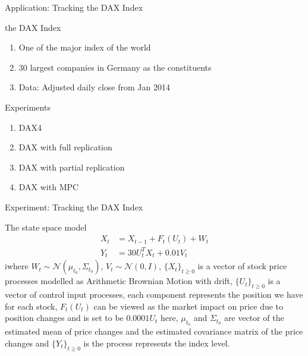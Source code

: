 \documentclass[handout]{beamer}
\begin{document}
\begin{frame}{Application: Tracking the DAX Index}
\begin{block}{the DAX Index}
\begin{enumerate}
\item One of the major index of the world
\item 30 largest companies in Germany as the constituents
\item Data: Adjusted daily close from Jan 2014
\end{enumerate}
\end{block}
\begin{block}{Experiments}
\begin{enumerate}
\item DAX4
\item DAX with full replication
\item DAX with partial replication
\item DAX with MPC
\end{enumerate}
\end{block}
\end{frame}

\begin{frame}{Experiment: Tracking the DAX Index}
\begin{block}{The state space model}
\begin{align*}
  X_t &= X_{t-1} + F_t(U_t) + W_t \\
  Y_t &= 30U^T_tX_t + 0.01V_t
\end{align*}
iwhere $W_t \sim \mathcal{N}(\mu_{t_0}, \Sigma_{t_0})$, $V_t \sim \mathcal{N}(0, I)$, $\{X_t\}_{t \geq 0}$ is a vector of stock price processes modelled as Arithmetic Brownian Motion with drift, $\{U_t\}_{t \geq 0}$ is a vector of control input processes, each component represents the position we have for each stock, $F_t(U_t)$ can be viewed as the market impact on price due to position changes and is set to be $0.0001U_t$ here, $\mu_{t_0}$ and $\Sigma_{t_0}$ are vector of the estimated mean of price changes and the estimated covariance matrix of the price changes and $\{Y_t\}_{t \geq 0}$ is the process represents the index level.
\end{block}
\end{frame}
\end{document}
